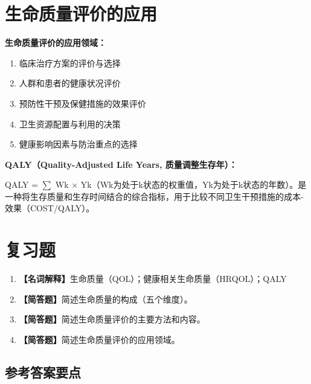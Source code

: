 \section{生命质量评价的应用}

\begin{defbox}
\textbf{生命质量评价的应用领域：}
\begin{enumerate}[leftmargin=*]
    \item 临床治疗方案的评价与选择
    \item 人群和患者的健康状况评价
    \item 预防性干预及保健措施的效果评价
    \item 卫生资源配置与利用的决策
    \item 健康影响因素与防治重点的选择
\end{enumerate}

\textbf{QALY（Quality-Adjusted Life Years, 质量调整生存年）：}

QALY = $\sum$ Wk × Yk（Wk为处于k状态的权重值，Yk为处于k状态的年数）。是一种将生存质量和生存时间结合的综合指标，用于比较不同卫生干预措施的成本-效果（COST/QALY）。
\end{defbox}

\section{复习题}

\begin{enumerate}[leftmargin=*, itemsep=8pt]
    \item \textbf{【名词解释】}生命质量（QOL）；健康相关生命质量（HRQOL）；QALY
    \item \textbf{【简答题】}简述生命质量的构成（五个维度）。
    \item \textbf{【简答题】}简述生命质量评价的主要方法和内容。
    \item \textbf{【简答题】}简述生命质量评价的应用领域。
\end{enumerate}

\subsection*{参考答案要点}

